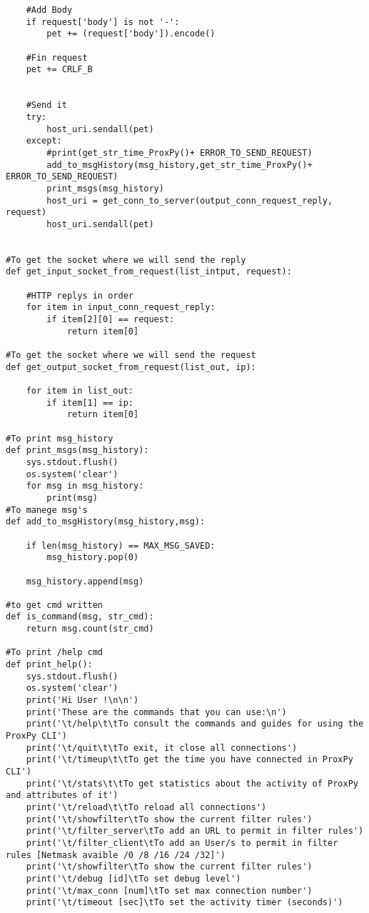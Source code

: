 \begin{verbatim}
    #Add Body 
    if request['body'] is not '-':
        pet += (request['body']).encode()
    
    #Fin request
    pet += CRLF_B


    #Send it
    try:
        host_uri.sendall(pet)
    except:
        #print(get_str_time_ProxPy()+ ERROR_TO_SEND_REQUEST)
        add_to_msgHistory(msg_history,get_str_time_ProxPy()+ ERROR_TO_SEND_REQUEST)
        print_msgs(msg_history)
        host_uri = get_conn_to_server(output_conn_request_reply, request)
        host_uri.sendall(pet)


#To get the socket where we will send the reply
def get_input_socket_from_request(list_intput, request):

    #HTTP replys in order
    for item in input_conn_request_reply:
        if item[2][0] == request:
            return item[0]

#To get the socket where we will send the request 
def get_output_socket_from_request(list_out, ip):

    for item in list_out:
        if item[1] == ip:
            return item[0]

#To print msg_history
def print_msgs(msg_history):
    sys.stdout.flush()
    os.system('clear')
    for msg in msg_history:
        print(msg)
#To manege msg's
def add_to_msgHistory(msg_history,msg):

    if len(msg_history) == MAX_MSG_SAVED:
        msg_history.pop(0)
    
    msg_history.append(msg)

#to get cmd written
def is_command(msg, str_cmd):
    return msg.count(str_cmd)

#To print /help cmd
def print_help():
    sys.stdout.flush()
    os.system('clear')
    print('Hi User !\n\n')
    print('These are the commands that you can use:\n')
    print('\t/help\t\tTo consult the commands and guides for using the ProxPy CLI')
    print('\t/quit\t\tTo exit, it close all connections')
    print('\t/timeup\t\tTo get the time you have connected in ProxPy CLI')
    print('\t/stats\t\tTo get statistics about the activity of ProxPy and attributes of it')
    print('\t/reload\t\tTo reload all connections')  
    print('\t/showfilter\tTo show the current filter rules')
    print('\t/filter_server\tTo add an URL to permit in filter rules')
    print('\t/filter_client\tTo add an User/s to permit in filter rules [Netmask avaible /0 /8 /16 /24 /32]')
    print('\t/showfilter\tTo show the current filter rules')
    print('\t/debug [id]\tTo set debug level')
    print('\t/max_conn [num]\tTo set max connection number')
    print('\t/timeout [sec]\tTo set the activity timer (seconds)')
    

\end{verbatim}
